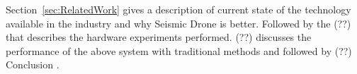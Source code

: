 Section~\ref{sec:RelatedWork}  gives a
description of current state of the technology available in the
industry and why Seismic Drone is better. Followed by the
(??) that describes the hardware experiments performed. (??)
discusses the performance of the above system with traditional methods and followed by (??) Conclusion .

